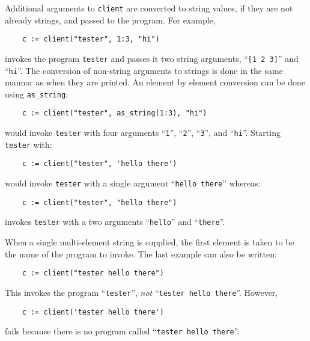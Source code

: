 Additional arguments to {\tt client} are converted to string
values, if they are not already strings, and passed to the program.
For example,
\begin{verbatim}
    c := client("tester", 1:3, "hi")
\end{verbatim}
invokes the program {\tt tester} and passes it two string arguments,
``\verb+[1 2 3]+'' and ``{\tt hi}''. The conversion of non-string
arguments to strings is done in the same mannar as when they are
printed. An element by element conversion can be done using {\tt as\_string}:
\begin{verbatim}
    c := client("tester", as_string(1:3), "hi")
\end{verbatim}
would invoke {\tt tester} with four arguments ``{\tt 1}'', ``{\tt 2}'',
``{\tt 3}'', and ``{\tt hi}''. Starting {\tt tester} with:
\begin{verbatim}
    c := client("tester", 'hello there')
\end{verbatim}
would invoke {\tt tester} with a single argument ``{\tt hello there}'' whereas:
\begin{verbatim}
    c := client("tester", "hello there")
\end{verbatim}
invokes {\tt tester} with a two arguments ``{\tt hello}'' and ``{\tt there}''.

When a single multi-element string is supplied, the first element is taken
to be the name of the program to invoke. The last example can also be written:
\begin{verbatim}
    c := client("tester hello there")
\end{verbatim}
This invokes the program ``{\tt tester}'', {\em not} ``{\tt tester hello there}''. However,
\begin{verbatim}
    c := client('tester hello there')
\end{verbatim}
fails because there is no program called ``{\tt tester hello there}''.

